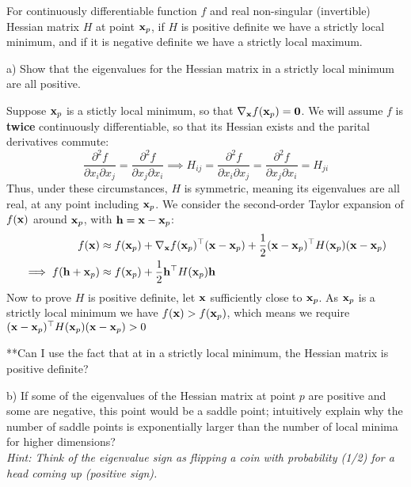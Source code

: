 \documentclass[a4paper]{article}
\newcommand{\1}{\mathbbm{1}}
\newcommand{\<}{\langle}
\renewcommand{\>}{\rangle}
\newcommand{\bs}{\boldsymbol}
\begin{document}
For continuously differentiable function $f$ and real non-singular (invertible) Hessian matrix $H$ at point $\bold x_p$, if $H$ is positive definite we have a strictly local minimum, and if it is negative definite we have a strictly local maximum.

a) Show that the eigenvalues for the Hessian matrix in a strictly local minimum are all positive.

\begin{ans}
Suppose $\bold x_p$ is a stictly local minimum, so that $\nabla_{\bold x} f(\bold x_p) = \bs0$. We will assume $f$ is \textbf{twice} continuously differentiable, so that its Hessian exists and the parital derivatives commute:
$$\frac{\partial^2 f}{\partial x_i \partial x_j} = \frac{\partial^2 f}{\partial x_j \partial x_i} \implies H_{ij} = \frac{\partial^2 f}{\partial x_i \partial x_j} = \frac{\partial^2 f}{\partial x_j \partial x_i} = H_{ji}$$
Thus, under these circumstances, $H$ is symmetric, meaning its eigenvalues are all real, at any point including $\bold x_p$. We consider the second-order Taylor expansion of $f(\bold x)$ around $\bold x_p$, with $\bold h = \bold x - \bold x_p$:
\begin{align*}
f(\bold x) &\approx f(\bold x_p) + \nabla_{\bold x} f(\bold x_p)^\top (\bold x - \bold x_p) + \frac12 (\bold x - \bold x_p)^\top H(\bold x_p) (\bold x - \bold x_p) \\
\implies f(\bold h + \bold x_p)&\approx f(\bold x_p) + \frac12 \bold h^\top H(\bold x_p) \bold h \\
\end{align*}
Now to prove $H$ is positive definite, let $\bold x$ sufficiently close to $\bold x_p$. As $\bold x_p$ is a strictly local minimum we have $f(\bold x) > f(\bold x_p)$, which means we require $(\bold x - \bold x_p)^\top H(\bold x_p) (\bold x - \bold x_p) > 0$



**Can I use the fact that at in a strictly local minimum, the Hessian matrix is positive definite?
\end{ans}

b) If some of the eigenvalues of the Hessian matrix at point $p$ are positive and some are negative, this point would be a saddle point; intuitively explain why the number of saddle points is exponentially larger than the number of local minima for higher dimensions? \\
\emph{Hint: Think of the eigenvalue sign as flipping a coin with probability (1/2) for a head coming up (positive sign).}
\end{document}
